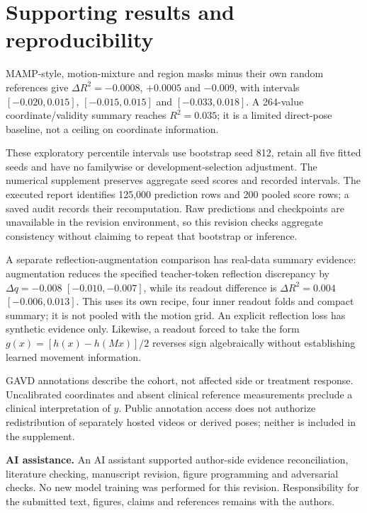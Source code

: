 \documentclass{article}
\begin{document}
\section{Supporting results and
reproducibility}\label{supporting-results-and-reproducibility}

MAMP-style, motion-mixture and region masks minus their own random
references give \(\Delta R^2=-0.0008\), \(+0.0005\) and \(-0.009\), with
intervals \([-0.020,0.015]\), \([-0.015,0.015]\) and \([-0.033,0.018]\).
A 264-value coordinate/validity summary reaches \(R^2=0.035\); it is a
limited direct-pose baseline, not a ceiling on coordinate information.

These exploratory percentile intervals use bootstrap seed 812, retain
all five fitted seeds and have no familywise or development-selection
adjustment. The numerical supplement preserves aggregate seed scores and
recorded intervals. The executed report identifies 125,000 prediction
rows and 200 pooled score rows; a saved audit records their
recomputation. Raw predictions and checkpoints are unavailable in the
revision environment, so this revision checks aggregate consistency
without claiming to repeat that bootstrap or inference.

A separate reflection-augmentation comparison has real-data summary
evidence: augmentation reduces the specified teacher-token reflection
discrepancy by \(\Delta q=-0.008\) \([-0.010,-0.007]\), while its
readout difference is \(\Delta R^2=0.004\) \([-0.006,0.013]\). This uses
its own recipe, four inner readout folds and compact summary; it is not
pooled with the motion grid. An explicit reflection loss has synthetic
evidence only. Likewise, a readout forced to take the form
\(g(x)=[h(x)-h(Mx)]/2\) reverses sign algebraically without establishing
learned movement information.

GAVD annotations describe the cohort, not affected side or treatment
response. Uncalibrated coordinates and absent clinical reference
measurements preclude a clinical interpretation of \(y\). Public
annotation access does not authorize redistribution of separately hosted
videos or derived poses; neither is included in the supplement.

\textbf{AI assistance.} An AI assistant supported author-side evidence
reconciliation, literature checking, manuscript revision, figure
programming and adversarial checks. No new model training was performed
for this revision. Responsibility for the submitted text, figures,
claims and references remains with the authors.
\end{document}
